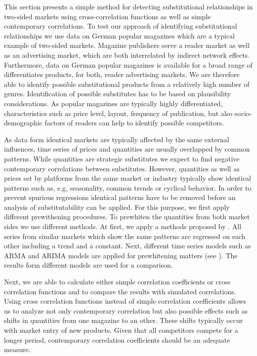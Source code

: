 \documentclass[12pt,a4paper,notitlepage]{article}
\begin{document}
This section presents a simple method for detecting substitutional relationships in two-sided markets using cross-correlation functions as well as simple contemporary correlations. To test our approach of identifying substitutional relationships we use data on German popular magazines which are a typical example of two-sided markets. Magazine publishers serve a reader market as well as an advertising market, which are both interrelated by indirect network effects. Furthermore, data on German popular magazines is available for a broad range of differentiates products, for both, reader advertising markets. We are therefore able to identify possible substitutional products from a relatively high number of genres. Identification of possible substitutes has to be based on plausibility considerations. As popular magazines are typically highly differentiated, characteristics such as price level, layout, frequency of publication, but also socio-demographic factors of readers can help to identify possible competitors.  

As data form identical markets are typically affected by the same external influences, time series of prices and quantities are usually overlapped by common patterns. While quantities are strategic substitutes we expect to find negative contemporary correlations between substitutes. However, quantities as well as prices set by platforms from the same market or industry typically show identical patterns such as, e.g, seasonality, common trends or cyclical behavior. In order to prevent spurious regressions identical patterns have to be removed before an analysis of substitutability can be applied. For this purpose, we first apply different prewithening procedures. To prewhiten the quantities from both market sides we use different methods. At first, we apply a methods proposed by \cite{dewenter_essays_2004}. All series from similar markets which show the same patterns are regressed on each other including a trend and a constant. Next, different time series models such as ARMA and ARIMA models are applied for prewhitening matters (see \cite{box_time_2008}). The results form different models are used for a comparison.

Next, we are able to calculate either simple correlation coefficients or cross correlation functions and to compare the results with simulated correlations. Using cross correlation functions instead of simple correlation coefficients allows us to analyze not only contemporary correlation but also possible effects such as shifts in quantities from one magazine to an other. These shifts typically occur with market entry of new products. Given that all competitors compete for a longer period, contemporary correlation coefficients should be an adequate measure. 
\end{document}
